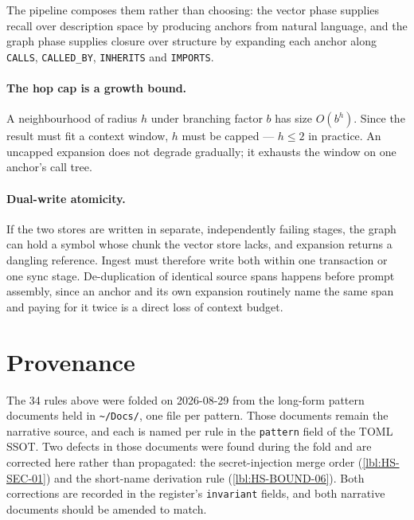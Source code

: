 \documentclass[11pt]{article}
\begin{document}
The pipeline composes them rather than choosing: the vector phase supplies
recall over description space by producing anchors from natural language, and
the graph phase supplies closure over structure by expanding each anchor along
\texttt{CALLS}, \texttt{CALLED\_BY}, \texttt{INHERITS} and \texttt{IMPORTS}.

\paragraph{The hop cap is a growth bound.} A neighbourhood of radius $h$ under
branching factor $b$ has size $O(b^h)$. Since the result must fit a context
window, $h$ must be capped --- $h \le 2$ in practice. An uncapped expansion
does not degrade gradually; it exhausts the window on one anchor's call tree.

\paragraph{Dual-write atomicity.} If the two stores are written in separate,
independently failing stages, the graph can hold a symbol whose chunk the vector
store lacks, and expansion returns a dangling reference. Ingest must therefore
write both within one transaction or one sync stage. De-duplication of identical
source spans happens before prompt assembly, since an anchor and its own
expansion routinely name the same span and paying for it twice is a direct loss
of context budget.

\section{Provenance}

The 34 rules above were folded on 2026-08-29 from the long-form pattern
documents held in \texttt{\textasciitilde/Docs/}, one file per pattern. Those
documents remain the narrative source, and each is named per rule in the
\texttt{pattern} field of the TOML SSOT. Two defects in those documents were found during the fold and are
corrected here rather than propagated: the secret-injection merge order
(\ref{lbl:HS-SEC-01}) and the short-name derivation rule
(\ref{lbl:HS-BOUND-06}). Both corrections are recorded in the register's
\texttt{invariant} fields, and both narrative documents should be amended to
match.
\end{document}

